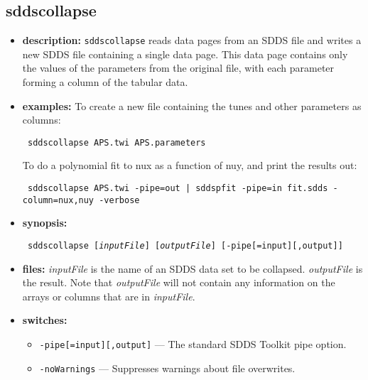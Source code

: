 \newpage
\subsection{sddscollapse}
\label{sddscollapse}

\begin{itemize}
\item {\bf description:}
\verb|sddscollapse| reads data pages from an SDDS file and writes a new SDDS file containing a single data page.
This data page contains only the values of the parameters from the original file, with each parameter forming a 
column of the tabular data.
\item {\bf examples:} 
To create a new file containing the tunes and other parameters as columns:
\begin{flushleft}{\tt
sddscollapse APS.twi APS.parameters
}\end{flushleft}
To do a polynomial fit to nux as a function of nuy, and print the results out:
\begin{flushleft}{\tt
sddscollapse APS.twi -pipe=out | sddspfit -pipe=in fit.sdds -column=nux,nuy -verbose
}\end{flushleft}
\item {\bf synopsis:} 
\begin{flushleft}{\tt
sddscollapse [{\em inputFile}] [{\em outputFile}] [-pipe[=input][,output]]
}\end{flushleft}
\item {\bf files:}
{\em inputFile} is the name of an SDDS data set to be collapsed.  {\em
outputFile} is the result.  Note that {\em outputFile} will not
contain any information on the arrays or columns that are in {\em
inputFile}.

\item {\bf switches:} 
\begin{itemize}
        \item {\tt -pipe[=input][,output]} --- The standard SDDS Toolkit pipe option.
        \item {\tt -noWarnings} --- Suppresses warnings about file overwrites.
\end{itemize}


\end{itemize}
